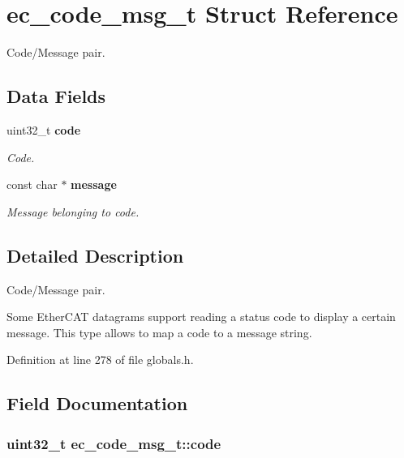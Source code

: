 \section{ec\-\_\-code\-\_\-msg\-\_\-t Struct Reference}
\label{structec__code__msg__t}


Code/\-Message pair.  


\subsection*{Data Fields}
\begin{DoxyCompactItemize}
\item 
uint32\-\_\-t {\bf code}
\begin{DoxyCompactList}\small\item\em Code. \end{DoxyCompactList}\item 
const char $\ast$ {\bf message}
\begin{DoxyCompactList}\small\item\em Message belonging to {\itshape code}. \end{DoxyCompactList}\end{DoxyCompactItemize}


\subsection{Detailed Description}
Code/\-Message pair. 

Some Ether\-C\-A\-T datagrams support reading a status code to display a certain message. This type allows to map a code to a message string. 

Definition at line 278 of file globals.\-h.



\subsection{Field Documentation}
\subsubsection[{code}]{\setlength{\rightskip}{0pt plus 5cm}uint32\-\_\-t ec\-\_\-code\-\_\-msg\-\_\-t\-::code}\label{structec__code__msg__t_a21dd735111c4e487365bf7570fda697d}


